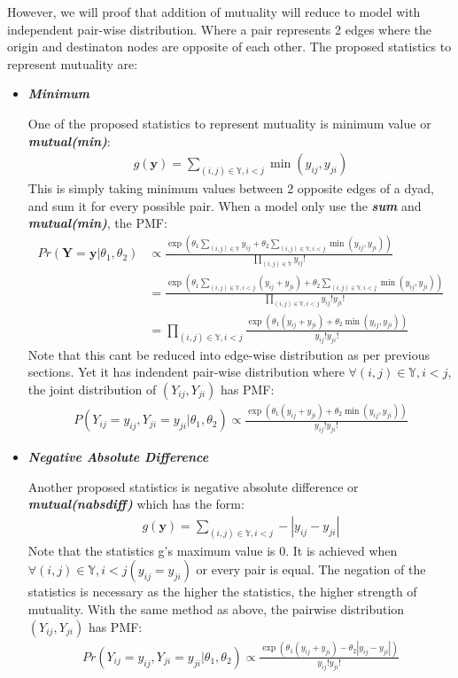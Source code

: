 \documentclass[12pt,a4paper,twoside,openany]{book}\usepackage[]{graphicx}\usepackage[]{color}
\begin{document}
However, we will proof that addition of mutuality will reduce to model with independent pair-wise distribution. 
Where a pair represents 2 edges where the origin and destinaton nodes are opposite of each other.
The proposed statistics to represent mutuality are:
\begin{itemize}

\item \textit{\textbf{Minimum}}

One of the proposed statistics to represent mutuality is minimum value or \textit{\textbf{mutual(min)}}: 
\begin{align}
g(\bm{y}) = \sum_{(i,j)\in\mathbb{Y},i<j} \min(y_{ij},y_{ji})
\end{align}
This is simply taking minimum values between 2 opposite edges of a dyad, and sum it for every possible pair.
When a model only use the \textit{\textbf{sum}} and \textit{\textbf{mutual(min)}}, the PMF:
\begin{align*}
Pr(\bm{Y}=\bm{y}|\theta_1,\theta_2) &\propto \frac{\exp\left(\theta_1 \sum_{(i,j) \in \mathbb{Y}} y_{ij} + \theta_{2}\sum_{(i,j)\in\mathbb{Y},i<j} \min(y_{ij},y_{ji})\right)}{\prod_{(i,j) \in \mathbb{Y}}y_{ij}!}\\
&= \frac{\exp\left(\theta_1 \sum_{(i,j) \in \mathbb{Y},i<j} (y_{ij}+y_{ji}) + \theta_{2}\sum_{(i,j)\in\mathbb{Y},i<j} \min(y_{ij},y_{ji})\right)}{\prod_{(i,j) \in \mathbb{Y},i<j}y_{ij}!y_{ji}!}\\
&= \prod_{(i,j) \in \mathbb{Y},i<j} \frac{\exp(\theta_1(y_{ij}+y_{ji})+\theta_2 \min(y_{ij},y_{ji}))}{y_{ij}!y_{ji}!}
\end{align*}
Note that this cant be reduced into edge-wise distribution as per previous sections. Yet it has indendent pair-wise distribution where $\forall(i,j) \in\mathbb{Y},i<j$, the joint distribution of $(Y_{ij},Y_{ji})$ has PMF:
\begin{align*}
P(Y_{ij}=y_{ij},Y_{ji}=y_{ji}|\theta_1,\theta_2) \propto \frac{\exp(\theta_1(y_{ij}+y_{ji})+\theta_2 \min(y_{ij},y_{ji}))}{y_{ij}!y_{ji}!}
\end{align*}

\item \textit{\textbf{Negative Absolute Difference}}

Another proposed statistics is negative absolute difference or \textit{\textbf{mutual(nabsdiff)}} which has the form:
\begin{align}
g(\bm{y}) = \sum_{(i,j)\in\mathbb{Y},i<j} -|y_{ij} - y_{ji}| 
\end{align}
Note that the statistics g's maximum value is 0. 
It is achieved when $\forall(i,j) \in\mathbb{Y},i<j (y_{ij}=y_{ji})$ or every pair is equal. 
The negation of the statistics is necessary as the higher the statistics, the higher strength of mutuality. 
With the same method as above, the pairwise distribution $(Y_{ij},Y_{ji})$ has PMF:
\begin{align*}
Pr(Y_{ij}=y_{ij},Y_{ji}=y_{ji}| \theta_1,\theta_2) \propto \frac{\exp(\theta_1 (y_{ij}+y_{ji}) - \theta_2 |y_{ij}-y_{ji}|)}{y_{ij}!y_{ji}!} 
\end{align*}


\end{itemize}
\end{document}
